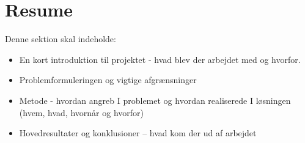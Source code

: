 \section{Resume}
Denne sektion skal indeholde:

\begin{itemize}
    \item En kort introduktion til projektet - hvad blev der arbejdet med og hvorfor.
    \item Problemformuleringen og vigtige afgrænsninger
    \item Metode - hvordan angreb I problemet og hvordan realiserede I løsningen (hvem, hvad, hvornår og hvorfor)
    \item Hovedresultater og konklusioner  – hvad kom der ud af arbejdet
\end{itemize}{}

